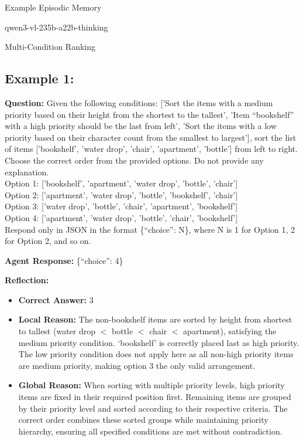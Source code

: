 \begin{promptbox}{Example Episodic Memory

qwen3-vl-235b-a22b-thinking

Multi-Condition Ranking}
\subsection*{Example 1:}
\textbf{Question:} Given the following conditions: ['Sort the items with a medium priority based on their height from the shortest to the tallest', 'Item ``bookshelf'' with a high priority should be the last from left', 'Sort the items with a low priority based on their character count from the smallest to largest'], sort the list of items ['bookshelf', 'water drop', 'chair', 'apartment', 'bottle'] from left to right. Choose the correct order from the provided options. Do not provide any explanation.\\
Option 1: ['bookshelf', 'apartment', 'water drop', 'bottle', 'chair']\\
Option 2: ['apartment', 'water drop', 'bottle', 'bookshelf', 'chair']\\
Option 3: ['water drop', 'bottle', 'chair', 'apartment', 'bookshelf']\\
Option 4: ['apartment', 'water drop', 'bottle', 'chair', 'bookshelf']\\
Respond only in JSON in the format \{``choice'': N\}, where N is 1 for Option 1, 2 for Option 2, and so on.

\textbf{Agent Response:} \{``choice'': 4\}

\textbf{Reflection:}
\begin{itemize}
  \item \textbf{Correct Answer:} 3
  \item \textbf{Local Reason:} The non-bookshelf items are sorted by height from shortest to tallest (water drop $<$ bottle $<$ chair $<$ apartment), satisfying the medium priority condition. `bookshelf' is correctly placed last as high priority. The low priority condition does not apply here as all non-high priority items are medium priority, making option 3 the only valid arrangement.
  \item \textbf{Global Reason:} When sorting with multiple priority levels, high priority items are fixed in their required position first. Remaining items are grouped by their priority level and sorted according to their respective criteria. The correct order combines these sorted groups while maintaining priority hierarchy, ensuring all specified conditions are met without contradiction.
\end{itemize}


\end{promptbox}
